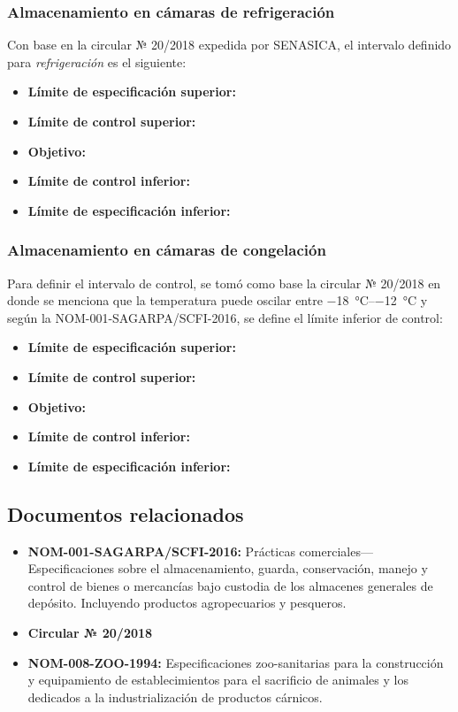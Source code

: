 \subsubsection{Almacenamiento en cámaras de refrigeración}

Con base en la circular № 20/2018 expedida por \Gls{SENASICA}, el intervalo definido para \emph{refrigeración} es el siguiente:

\begin{itemize}
	\item \textbf{Límite de especificación superior:} 
	\item \textbf{Límite de control superior:} 
	\item \textbf{Objetivo:} 
	\item \textbf{Límite de control inferior:} 
	\item \textbf{Límite de especificación inferior:} 
\end{itemize}

\subsubsection{Almacenamiento en cámaras de congelación}

Para definir el intervalo de control, se tomó como base la circular № 20/2018  en donde se menciona que la temperatura puede oscilar entre \qtyrange{-18}{-12}{\celsius} y según la NOM-001-SAGARPA/SCFI-2016, se define el límite inferior de control:

\begin{itemize}
	\item \textbf{Límite de especificación superior:} 
	\item \textbf{Límite de control superior:} 
	\item \textbf{Objetivo:} 
	\item \textbf{Límite de control inferior:} 
	\item \textbf{Límite de especificación inferior:} 
\end{itemize}

\subsection{Documentos relacionados}

\begin{itemize}
	\item \textbf{NOM-001-SAGARPA/SCFI-2016:} Prácticas comerciales—Especificaciones sobre el almacenamiento, guarda, conservación, manejo y control de bienes o mercancías bajo custodia de los almacenes generales de depósito. Incluyendo productos agropecuarios y pesqueros.
	\item \textbf{Circular № 20/2018 }
	\item \textbf{NOM-008-ZOO-1994:} Especificaciones zoo-sanitarias para la construcción y equipamiento de establecimientos para el sacrificio de animales y los dedicados a la industrialización de productos cárnicos.
\end{itemize}

